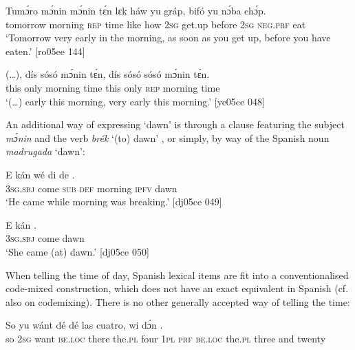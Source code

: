 \ea%
    \label{ex:key:997}
    \gll Tumɔ́ro    mɔ́nin  mɔ́nin  tɛ́n    lɛk  háw  yu  gráp,
bifó    yu  nɔ́ba  chɔ́p.\\
tomorrow  morning  \textsc{rep}    time    like  how  \textsc{2sg}  get.up 
before  \textsc{2sg}  \textsc{neg}.\textsc{prf}  eat\\
\glt ‘Tomorrow very early in the morning, as soon as you get up, 
before you have eaten.’ [ro05ee 144]
\z


\ea%
    \label{ex:key:998}
    \gll (…),  dís  sósó    mɔ́nin  tɛ́n,  dís  sósó    sósó    mɔ́nin  tɛ́n.\\
{}  this  only    morning  time  this  only    \textsc{rep}    morning  time\\

\glt ‘(…) early this morning, very early this morning.’ [ye05ce 048]
\z

An additional way of expressing ‘dawn’ is through a clause featuring the subject \textit{mɔ́nin} and the verb \textit{brék} ‘(to) dawn’ , or simply, by way of the Spanish noun \textit{madrugada} ‘dawn’:


\ea%
    \label{ex:key:999}
    \gll E    kán    wé  di    de  .\\
\textsc{3sg.sbj}  come  \textsc{sub}  \textsc{def}  morning  \textsc{ipfv}  dawn\\

\glt ‘He came while morning was breaking.’ [dj05ce 049]
\z


\ea%
    \label{ex:key:1000}
    \gll E    kán    .\\
\textsc{3sg.sbj}  come  dawn\\

\glt ‘She came (at) dawn.’ [dj05ce 050]
\z

When telling the time of day, Spanish lexical items are fit into a conventionalised code-mixed construction, which does not have an exact equivalent in Spanish (cf. also  on codemixing). There is no other generally accepted way of telling the time:


\ea%
    \label{ex:key:1001}
    \gll So  yu  wánt  dé    dé    las    cuatro,  wi  dɔ́n   
          .\\
so  \textsc{2sg}  want  \textsc{be.loc}  there  the.\textsc{pl}  four    \textsc{1pl}  \textsc{prf}  \textsc{be.loc}
the.\textsc{pl}  three  and  twenty\\

